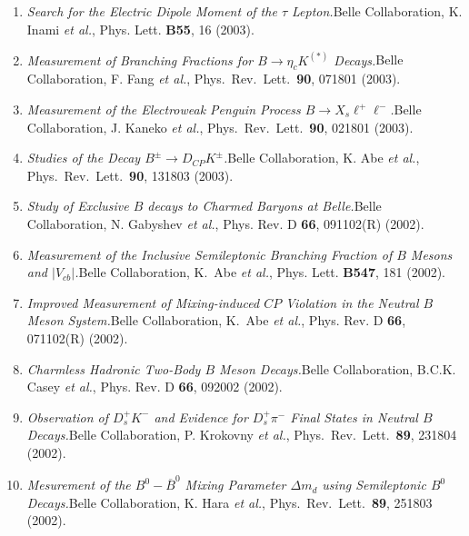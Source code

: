 \documentclass[10pt,a4paper]{article}
\def\pub#1#2#3{{\it #1.}\newline #2, #3.}
\def\cited#1{Cited $\ge$ #1}
\def\PLB#1{Phys. Lett. {\bf B#1}}
\def\PRL{Phys.\ Rev.\ Lett.\ }
\def\etal{{\it et al.}}
\def\belle{Belle Collaboration, K.~Abe \etal }
\begin{document}
\begin{enumerate}
\item
\pub{Search for the Electric Dipole Moment of the $\tau$ Lepton}
{Belle Collaboration, K. Inami \etal}
{\PLB{55}, 16 (2003)}

\item
\pub{Measurement of Branching Fractions for $B\to \eta_c K^{(*)}$
Decays}
{Belle Collaboration, F. Fang \etal}
{\PRL {\bf 90}, 071801 (2003)}

\item
\pub{Measurement of the Electroweak Penguin Process 
$B \to X_s \ell^+ \ell^-$} 
{Belle Collaboration, J. Kaneko \etal}
{\PRL {\bf 90}, 021801 (2003)}

\item
\pub{Studies of the Decay $B^{\pm} \to D_{CP} K^{\pm}$}
{Belle Collaboration, K. Abe \etal}
{\PRL {\bf 90}, 131803 (2003)}


\item
\pub{Study of Exclusive $B$ decays to Charmed Baryons at Belle}
{Belle Collaboration, N. Gabyshev \etal}
{Phys. Rev. D {\bf 66}, 091102(R) (2002)}

\item
\pub{Measurement of the Inclusive Semileptonic Branching Fraction of
$B$ Mesons and $|V_{cb}|$}
{\belle}
{\PLB{547}, 181 (2002)}

\item
\pub{Improved Measurement of Mixing-induced $CP$ Violation in the
Neutral $B$ Meson System} 
{\belle}
{Phys. Rev. D {\bf 66}, 071102(R) (2002)}

\item
\pub{Charmless Hadronic Two-Body $B$ Meson Decays}
{Belle Collaboration, B.C.K. Casey \etal}
{Phys. Rev. D {\bf 66}, 092002 (2002)}

\item
\pub{Observation of $D_s^+ K^-$ and Evidence for $D_s^+ \pi^-$ Final
States in Neutral $B$ Decays} 
{Belle Collaboration, P. Krokovny \etal}
{\PRL {\bf 89}, 231804 (2002)}

\item
\pub{Mesurement of the $B^0 - \overline{B}^0$ Mixing Parameter
$\Delta m_d$ using Semileptonic $B^0$ Decays}
{Belle Collaboration, K. Hara \etal}
{\PRL {\bf 89}, 251803 (2002)}


\end{enumerate}
\end{document}
